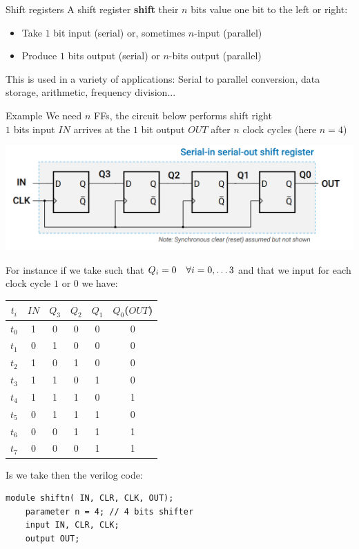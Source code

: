 \begin{parag}{Shift registers}
    A shift register \textbf{shift} their $n$ bits value one bit to the left or right:
    \begin{itemize}
        \item Take $1$ bit input (serial) or, sometimes $n$-input (parallel)
        \item Produce $1$ bits output (serial) or $n$-bits output (parallel)
    \end{itemize}
    This is used in a variety of applications: Serial to parallel conversion, data storage, arithmetic, frequency division...
    
    
\end{parag}


\begin{parag}{Example}
    We need $n$ FFs, the circuit below performs shift right\\
    $1$ bits input $IN$ arrives at the $1$ bit output $OUT$ after $n$ clock cycles (here $n = 4$)
    \begin{center}
        \includegraphics[scale=0.3]{42025-06-20.png}
    \end{center}
    For instance if we take such that $Q_i = 0 \quad \forall i =0, \ldots 3$ and that we input for each clock cycle $1$ or $0$ we have:
    \begin{center} \begin{tabular}{c|c|cccc}$t_i$ & $IN$ & $Q_3$ & $Q_2$ & $Q_1$ & $Q_0$($OUT$) \\   \hline
 $t_0$ & 1 & 0 & 0 & 0 & 0 \\ $t_1$ & 0 & 1 & 0 & 0 & 0 \\ $t_2$ & 1 & 0 & 1 &0  &0  \\$t_3$   & 1 &1  &0  &1  &0  \\ $t_4$ &1  &1  &1  & 0 & 1 \\ $t_5$ &0  & 1 &1  &1  &0  \\$t_6$  & 0 & 0 & 1 & 1 &1 \\
    $t_7$ &0 & 0 & 0 & 1 & 1  \end{tabular} \end{center} 
    Is we take then the verilog code:
    \begin{lstlisting}
module shiftn( IN, CLR, CLK, OUT);
    parameter n = 4; // 4 bits shifter
    input IN, CLR, CLK;
    output OUT;


\end{lstlisting}
\end{parag}
